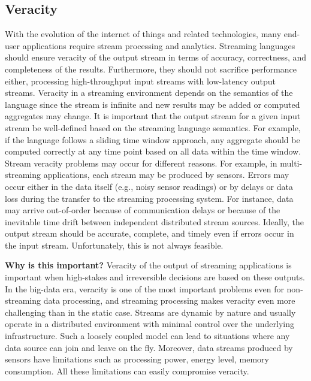 \subsection{Veracity}



With the evolution of the internet of things and related technologies,
many end-user applications require stream processing and analytics.
Streaming languages should ensure veracity of the output stream in
terms of accuracy, correctness, and completeness of the results.
Furthermore, they should not sacrifice performance either, processing
high-throughput input streams with low-latency output streams.
Veracity in a streaming environment depends on the semantics of the
language since the stream is infinite and new results may be added or
computed aggregates may change. It is important that the output stream
for a given input stream be well-defined based on the streaming
language semantics. For example, if the language follows a sliding
time window approach, any aggregate should be computed correctly at
any time point based on all data within the time window.
%
Stream veracity problems may occur for different reasons. For example,
in multi-streaming applications, each stream may be produced by
sensors. Errors may occur either in the data itself (e.g., noisy
sensor readings) or by delays or data loss during the transfer to the
streaming processing system. For instance, data may arrive
out-of-order because of communication delays or because of the
inevitable time drift between independent distributed stream sources.
Ideally, the output stream should be accurate, complete, and timely
even if errors occur in the input stream.  Unfortunately, this is not
always feasible.

\textbf{Why is this important?}
%
Veracity of the output of streaming applications is important when
high-stakes and irreversible decisions are based on these outputs.  In
the big-data era, veracity is one of the most important problems even
for non-streaming data processing, and streaming processing makes
veracity even more challenging than in the static case. Streams are
dynamic by nature and usually operate in a distributed environment
with minimal control over the underlying infrastructure. Such a
loosely coupled model can lead to situations where any data source can
join and leave on the fly. Moreover, data streams produced by sensors
have limitations such as processing power, energy level, memory
consumption. All these limitations can easily compromise veracity.

